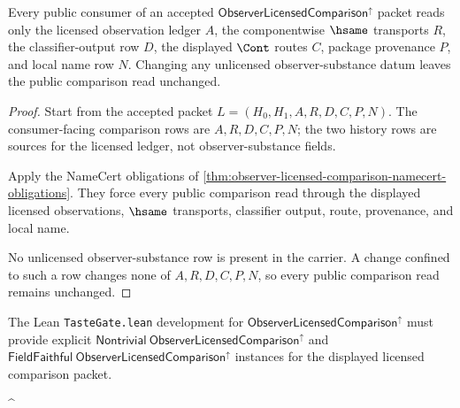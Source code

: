 \begin{theorem}
\label{thm:observer-licensed-comparison-nonescape}
Every public consumer of an accepted $\mathsf{ObserverLicensedComparison}^{\uparrow}$ packet reads only the licensed observation ledger $A$, the componentwise $\hsame$ transports $R$, the classifier-output row $D$, the displayed $\Cont$ routes $C$, package provenance $P$, and local name row $N$. Changing any unlicensed observer-substance datum leaves the public comparison read unchanged.
\end{theorem}
\begin{proof}
Start from the accepted packet $L=(H_0,H_1,A,R,D,C,P,N)$. The consumer-facing comparison rows are $A,R,D,C,P,N$; the two history rows are sources for the licensed ledger, not observer-substance fields.

Apply the NameCert obligations of \autoref{thm:observer-licensed-comparison-namecert-obligations}. They force every public comparison read through the displayed licensed observations, $\hsame$ transports, classifier output, route, provenance, and local name.

No unlicensed observer-substance row is present in the carrier. A change confined to such a row changes none of $A,R,D,C,P,N$, so every public comparison read remains unchanged.
\end{proof}

The Lean \texttt{TasteGate.lean} development for $\mathsf{ObserverLicensedComparison}^{\uparrow}$ must provide explicit $\mathsf{Nontrivial}\ \mathsf{ObserverLicensedComparison}^{\uparrow}$ and $\mathsf{FieldFaithful}\ \mathsf{ObserverLicensedComparison}^{\uparrow}$ instances for the displayed licensed comparison packet.


\begin{closurestatus}{^{\uparrow}}
  \theoryclosure{\seedClosure}
  \formalstatus{\unformalizedV}
\end{closurestatus}
